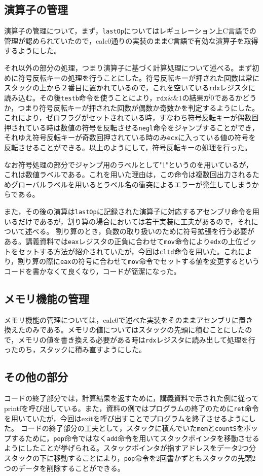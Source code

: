 \documentclass[a4paper]{jsarticle}
\newcommand{\var}[1]{\texttt{#1}}
\begin{document}
\subsection{演算子の管理}
演算子の管理について，まず，\var{lastOp}についてはレギュレーション上C言語での管理が認められていたので，calc0通りの実装のままC言語で有効な演算子を取得するようにした。

それ以外の部分の処理，つまり演算子に基づく計算処理について述べる。まず初めに符号反転キーの処理を行うことにした。符号反転キーが押された回数は常にスタックの上から２番目に置かれているので，これを空いている\var{rdx}レジスタに読み込む。その後\var{testb}命令を使うことにより，$\var{rdx} \&\& 1$の結果が0であるかどうか，つまり符号反転キーが押された回数が偶数か奇数かを判定するようにした。これにより，ゼロフラグがセットされている時，すなわち符号反転キーが偶数回押されている時は数値の符号を反転させる\var{negl}命令をジャンプすることができ，それゆえ符号反転キーが奇数回押されている時のみ\var{ecx}に入っている値の符号を反転させることができる。以上のようにして，符号反転キーの処理を行った。

なお符号処理の部分でジャンプ用のラベルとして"1"というのを用いているが，これは数値ラベルである。これを用いた理由は，この命令は複数回出力されるためグローバルラベルを用いるとラベル名の衝突によるエラーが発生してしまうからである。

また，その後の演算は\var{lastOp}に記録された演算子に対応するアセンブリ命令を用いるだけであるが，割り算の場合においては若干実装に工夫があるので，それについて述べる。
割り算のとき，負数の取り扱いのために符号拡張を行う必要がある。講義資料では\var{eax}レジスタの正負に合わせて\var{mov}命令により\var{edx}の上位ビットをセットする方法が紹介されていたが，今回は\var{cltd}命令を用いた。これにより，割り算の際に\var{eax}の符号に合わせて\var{mov}命令でセットする値を変更するというコードを書かなくて良くなり，コードが簡潔になった。

\subsection{メモリ機能の管理}
メモリ機能の管理については，calc0で述べた実装をそのままアセンブリに置き換えたのみである。メモリの値についてはスタックの先頭に積むことにしたので，メモリの値を書き換える必要がある時は\var{rdx}レジスタに読み出して処理を行ったのち，スタックに積み直すようにした。

\subsection{その他の部分}
コードの終了部分では，計算結果を返すために，講義資料で示された例に従ってprintfを呼び出している。また，資料の例ではプログラムの終了のために\var{ret}命令を用いていたが，今回はexitを呼び出すことでプログラムを終了させるようにした。
コードの終了部分の工夫として，スタックに積んでいた\var{mem}と\var{countS}をポップするために，\var{pop}命令ではなく\var{add}命令を用いてスタックポインタを移動させるようにしたことが挙げられる。スタックポインタが指すアドレスをデータ2つ分スタックの下に移動することにより，\var{pop}命令を2回書かずともスタックの先頭2つのデータを削除することができる。
\end{document}
